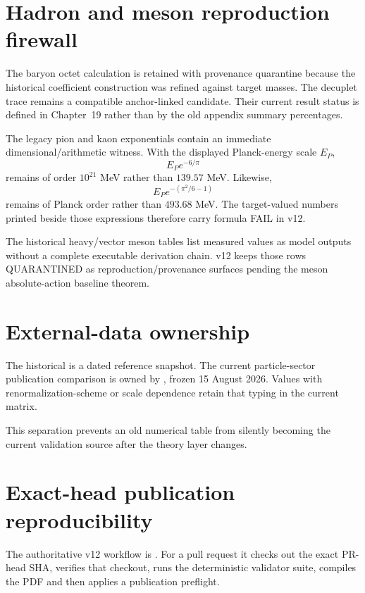 \section{Hadron and meson reproduction firewall}

The baryon octet calculation is retained with provenance quarantine because
the historical coefficient construction was refined against target masses.
The decuplet trace remains a compatible anchor-linked candidate.  Their
current result status is defined in Chapter~19 rather than by the old appendix
summary percentages.

The legacy pion and kaon exponentials contain an immediate dimensional/arithmetic
witness.  With the displayed Planck-energy scale \(E_P\),
\[
E_Pe^{-6/\pi}
\]
remains of order \(10^{21}\) MeV rather than \(139.57\) MeV.  Likewise,
\[
E_Pe^{-(\pi^2/6-1)}
\]
remains of Planck order rather than \(493.68\) MeV.  The target-valued numbers
printed beside those expressions therefore carry formula FAIL in v12.

The historical heavy/vector meson tables list measured values as model outputs
without a complete executable derivation chain.  v12 keeps those rows
QUARANTINED as reproduction/provenance surfaces pending the meson absolute-action
baseline theorem.

\section{External-data ownership}

The historical
is a dated reference snapshot.  The current particle-sector publication
comparison is owned by
,
frozen 15 August 2026.  Values with renormalization-scheme or scale dependence
retain that typing in the current matrix.

This separation prevents an old numerical table from silently becoming the
current validation source after the theory layer changes.

\section{Exact-head publication reproducibility}

The authoritative v12 workflow is
.
For a pull request it checks out the exact PR-head SHA, verifies that checkout,
runs the deterministic validator suite, compiles the PDF and then applies a
publication preflight.

